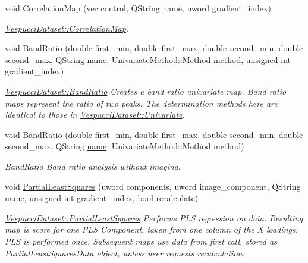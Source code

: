 \begin{DoxyCompactItemize}
\item 
void \hyperlink{class_vespucci_dataset_a9da8a2ee67a055d50b0ef19be453e3a6}{Correlation\+Map} (vec control, Q\+String \hyperlink{class_vespucci_dataset_ae5b30cb466acfdf741b360bc4f897cc9}{name}, uword gradient\+\_\+index)
\begin{DoxyCompactList}\small\item\em \hyperlink{class_vespucci_dataset_a9da8a2ee67a055d50b0ef19be453e3a6}{Vespucci\+Dataset\+::\+Correlation\+Map}. \end{DoxyCompactList}\item 
void \hyperlink{class_vespucci_dataset_a3c0e0831d508437377ead473f98b38be}{Band\+Ratio} (double first\+\_\+min, double first\+\_\+max, double second\+\_\+min, double second\+\_\+max, Q\+String \hyperlink{class_vespucci_dataset_ae5b30cb466acfdf741b360bc4f897cc9}{name}, Univariate\+Method\+::\+Method method, unsigned int gradient\+\_\+index)
\begin{DoxyCompactList}\small\item\em \hyperlink{class_vespucci_dataset_a3c0e0831d508437377ead473f98b38be}{Vespucci\+Dataset\+::\+Band\+Ratio} Creates a band ratio univariate map. Band ratio maps represent the ratio of two peaks. The determination methods here are identical to those in \hyperlink{class_vespucci_dataset_a385a4f192546dc9fb0c363ca7611d0a2}{Vespucci\+Dataset\+::\+Univariate}. \end{DoxyCompactList}\item 
void \hyperlink{class_vespucci_dataset_a665c83f1ca58c875a042a867766918e4}{Band\+Ratio} (double first\+\_\+min, double first\+\_\+max, double second\+\_\+min, double second\+\_\+max, Q\+String \hyperlink{class_vespucci_dataset_ae5b30cb466acfdf741b360bc4f897cc9}{name}, Univariate\+Method\+::\+Method method)
\begin{DoxyCompactList}\small\item\em Band\+Ratio Band ratio analysis without imaging. \end{DoxyCompactList}\item 
void \hyperlink{class_vespucci_dataset_a300693f9bc5b14cbfc9ac710af4b09a1}{Partial\+Least\+Squares} (uword components, uword image\+\_\+component, Q\+String \hyperlink{class_vespucci_dataset_ae5b30cb466acfdf741b360bc4f897cc9}{name}, unsigned int gradient\+\_\+index, bool recalculate)
\begin{DoxyCompactList}\small\item\em \hyperlink{class_vespucci_dataset_a300693f9bc5b14cbfc9ac710af4b09a1}{Vespucci\+Dataset\+::\+Partial\+Least\+Squares} Performs P\+L\+S regression on data. Resulting map is score for one P\+L\+S Component, taken from one column of the X loadings. P\+L\+S is performed once. Subsequent maps use data from first call, stored as Partial\+Least\+Squares\+Data object, unless user requests recalculation. \end{DoxyCompactList}\item 

\end{DoxyCompactItemize}
